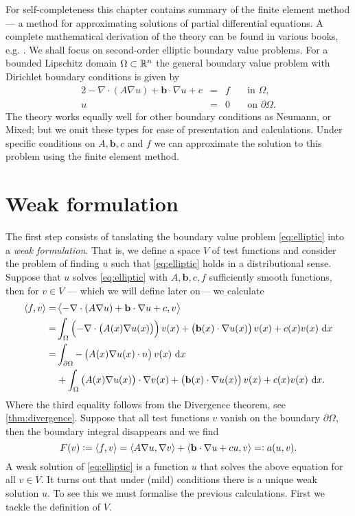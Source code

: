 \documentclass[thesis.tex]{subfiles}
\begin{document}
For self-completeness this chapter contains summary of the finite element method ---
a method for approximating solutions of partial differential equations.
A complete mathematical derivation of the theory can be found in various books, e.g. \cite{brenner}. 
We shall focus on second-order elliptic boundary value problems. For a bounded Lipschitz domain $\Omega \subset \mathbb{R}^n$ the 
general boundary value problem with Dirichlet boundary conditions is given by
\begin{alignat}{2}
  -\nabla \cdot {\left(A \nabla u\right)} + \mathbf{b} \cdot \nabla u + c &= &f \quad  &\text {in } \Omega,  \label{eq:elliptic}\\
  u  &=& 0 \quad &\text{on } \partial\Omega.\nonumber
\end{alignat}
The theory works equally well for other boundary conditions as Neumann, or Mixed; but we omit
these types for ease of presentation and calculations. Under specific conditions on $A,\mathbf{b}, c$ 
and $f$ we can approximate the solution to this problem using the finite element method.

\section{Weak formulation}
The first step consists of tanslating the boundary value problem \eqref{eq:elliptic} into a \emph{weak formulation}.  
That is, we define a space $V$ of test functions and consider the problem of finding $u$ such that \eqref{eq:elliptic} holds 
in a distributional sense. Suppose that $u$ solves \eqref{eq:elliptic} with $A, \mathbf{b}, c, f$ sufficiently smooth functions, then for $v \in V$ --- which we will define later on--- we calculate
\begin{align*}
  \ip{f,v} = &\ip{-\nabla \cdot {\left(A \nabla u\right)} + \mathbf{b} \cdot \nabla u + c, v} \\
           = &\int_\Omega \left( -\nabla \cdot {\left(A(x) \nabla u(x)\right)}\right)v(x) + \left(\mathbf{b}(x) \cdot \nabla u(x)\right)v(x) + c(x) v(x) \, \dif x\\
           = &\int_{\partial \Omega} -\left(A(x) \nabla u(x) \cdot n\right)v(x) \, \dif x \\
              &+ \int_{\Omega} \left( A(x) \nabla u(x)\right) \cdot \nabla v(x) + \left(\mathbf{b}(x) \cdot \nabla u(x)\right)v(x) + c(x) v(x) \, \dif x.
\end{align*}
Where the third equality follows from the Divergence theorem, see \ref{thm:divergence}. Suppose that all test functions $v$ vanish on the boundary $\partial \Omega$, then the boundary integral disappears and we find
\begin{equation}
  \label{eq:ellipticweak}
  F(v) := \left \langle f,v \right \rangle = \left \langle A \nabla u, \nabla v \right \rangle + \left \langle \mathbf{b} \cdot \nabla u + cu, v \right \rangle=: a(u,v).
\end{equation}
A weak solution of \eqref{eq:elliptic} is a function $u$ that solves the above equation for all $v \in V$.
It turns out that under (mild) conditions there is a unique weak solution $u$. To see this
we must formalise the previous calculations. First we tackle the definition of $V$.
\end{document}
